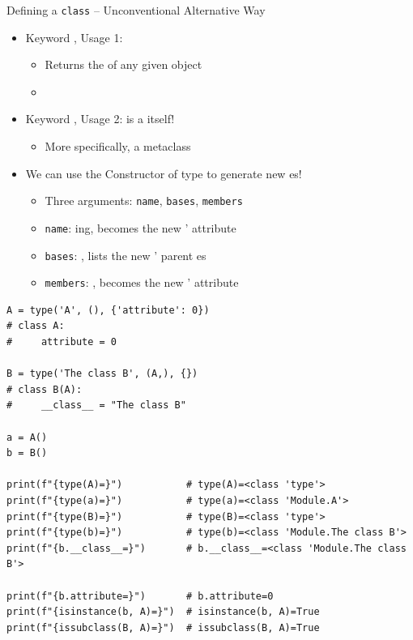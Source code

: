 \begin{frame}{Defining a \texttt{class} -- Unconventional Alternative Way}
%
\begin{itemize}
\item Keyword , Usage 1:
	\begin{itemize}
	\item Returns the  of any given object
	\item {}
	\end{itemize}
\item Keyword , Usage 2:  is a  itself!
	\begin{itemize}
	\item More specifically, a metaclass
	\end{itemize}
\item[\Thus] We can use the Constructor of type  to generate new es!
	\begin{itemize}
	\item Three arguments: \texttt{name}, \texttt{bases}, \texttt{members}
	\item \texttt{name}: ing, becomes the new '  attribute
	\item \texttt{bases}: , lists the new ' parent es
	\item \texttt{members}: , becomes the new '  attribute
	\end{itemize}
\end{itemize}
%
\end{frame}


\begin{frame}[fragile]
%
\begin{codebox}
\begin{verbatim}
A = type('A', (), {'attribute': 0})
# class A:
#     attribute = 0

B = type('The class B', (A,), {})
# class B(A):
#     __class__ = "The class B"

a = A()
b = B()

print(f"{type(A)=}")           # type(A)=<class 'type'>
print(f"{type(a)=}")           # type(a)=<class 'Module.A'>
print(f"{type(B)=}")           # type(B)=<class 'type'>
print(f"{type(b)=}")           # type(b)=<class 'Module.The class B'>
print(f"{b.__class__=}")       # b.__class__=<class 'Module.The class B'>

print(f"{b.attribute=}")       # b.attribute=0
print(f"{isinstance(b, A)=}")  # isinstance(b, A)=True
print(f"{issubclass(B, A)=}")  # issubclass(B, A)=True
\end{verbatim}
\end{codebox}
%
\end{frame}

